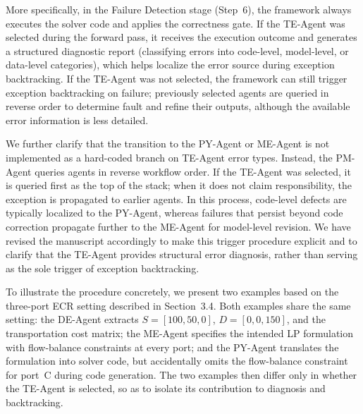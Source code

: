 \documentclass[11pt,a4paper]{article}
\begin{document}
More specifically, in the Failure Detection stage (Step~6), the framework always executes the solver code and applies the correctness gate. If the TE-Agent was selected during the forward pass, it receives the execution outcome and generates a structured diagnostic report (classifying errors into code-level, model-level, or data-level categories), which helps localize the error source during exception backtracking. If the TE-Agent was not selected, the framework can still trigger exception backtracking on failure; previously selected agents are queried in reverse order to determine fault and refine their outputs, although the available error information is less detailed.

We further clarify that the transition to the PY-Agent or ME-Agent is not implemented as a hard-coded branch on TE-Agent error types. Instead, the PM-Agent queries agents in reverse workflow order. If the TE-Agent was selected, it is queried first as the top of the stack; when it does not claim responsibility, the exception is propagated to earlier agents. In this process, code-level defects are typically localized to the PY-Agent, whereas failures that persist beyond code correction propagate further to the ME-Agent for model-level revision. We have revised the manuscript accordingly to make this trigger procedure explicit and to clarify that the TE-Agent provides structural error diagnosis, rather than serving as the sole trigger of exception backtracking.

To illustrate the procedure concretely, we present two examples based on the three-port ECR setting described in Section~3.4. Both examples share the same setting: the DE-Agent extracts $S{=}[100,50,0]$, $D{=}[0,0,150]$, and the transportation cost matrix; the ME-Agent specifies the intended LP formulation with flow-balance constraints at every port; and the PY-Agent translates the formulation into solver code, but accidentally omits the flow-balance constraint for port~C during code generation. The two examples then differ only in whether the TE-Agent is selected, so as to isolate its contribution to diagnosis and backtracking.
\end{document}
